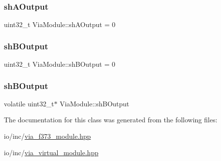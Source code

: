 \mbox{\label{class_via_module_aff6cc2fd90847c64a6320fd17c0da74a}} 
\subsubsection{\texorpdfstring{sh\+A\+Output}{shAOutput}\hspace{0.1cm}{\footnotesize\ttfamily [2/2]}}
{\footnotesize\ttfamily uint32\+\_\+t Via\+Module\+::sh\+A\+Output = 0}

\mbox{\label{class_via_module_a7cfbe5fe6b6afb143cb55ff53cdcc90e}} 
\subsubsection{\texorpdfstring{sh\+B\+Output}{shBOutput}\hspace{0.1cm}{\footnotesize\ttfamily [1/2]}}
{\footnotesize\ttfamily uint32\+\_\+t Via\+Module\+::sh\+B\+Output = 0}

\mbox{\label{class_via_module_a9d6d3dd39cf5560aaf2b14a6d7c4a46b}} 
\subsubsection{\texorpdfstring{sh\+B\+Output}{shBOutput}\hspace{0.1cm}{\footnotesize\ttfamily [2/2]}}
{\footnotesize\ttfamily volatile uint32\+\_\+t$\ast$ Via\+Module\+::sh\+B\+Output}



The documentation for this class was generated from the following files\+:\begin{DoxyCompactItemize}
\item 
io/inc/\mbox{\hyperlink{via__f373__module_8hpp}{via\+\_\+f373\+\_\+module.\+hpp}}\item 
io/inc/\mbox{\hyperlink{via__virtual__module_8hpp}{via\+\_\+virtual\+\_\+module.\+hpp}}\end{DoxyCompactItemize}
